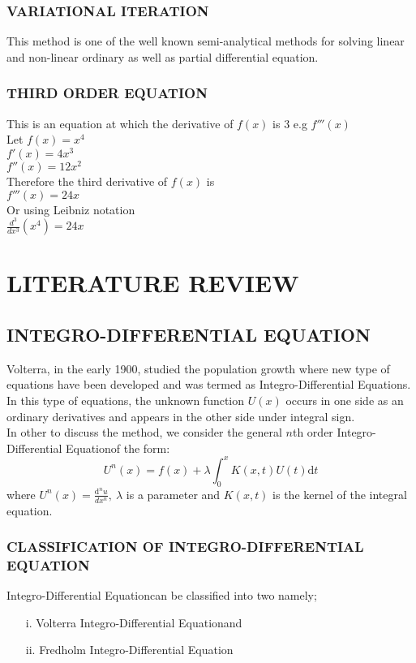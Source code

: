 \documentclass[12pt]{report}
\newcommand{\NI}{\noindent}
\newcommand{\dsp}{\displaystyle}
\newcommand{\IDE}{Integro-Differential Equation}
\newcommand{\IDEs}{Integro-Differential Equations}
\begin{document}
	\subsection{VARIATIONAL ITERATION}
	This method is one of the well known semi-analytical methods for solving linear and non-linear ordinary as well as partial differential equation.
	
	\subsection{THIRD ORDER EQUATION}
	This is an equation at which the derivative of $f(x)$ is 3 e.g $f'''(x)$\\
	Let
	$\dsp f(x) = x^4$\\
	$\dsp f'(x) = 4x^3$\\
	$\dsp f''(x) = 12x^2$\\
	Therefore the third derivative of $f(x)$ is\\
	$\dsp f'''(x) = 24x$\\
	Or using Leibniz notation\\
	$\dsp \frac{d^3}{dx^3}(x^4) = 24x$\\
	
	\chapter{LITERATURE REVIEW}
	\section{INTEGRO-DIFFERENTIAL EQUATION}
	Volterra, in the early 1900, studied the population growth where new type of equations have been developed and was termed as \IDEs. In this type of equations, the unknown function $U(x)$ occurs in one side as an ordinary derivatives and appears in the other side under integral sign.\\
	
	\NI In other to discuss the method, we consider the general $n$th order \IDE of the form:
	\begin{equation}
		U^n(x) = f(x) + \lambda \int_{0}^{x}K(x,t)U(t)\text{d}t
	\end{equation}
	where $\dsp U^n(x) = \frac{\text{d}^n u}{dx^n}, ~ \lambda$ is a parameter and $K(x,t)$ is the kernel of the integral equation.\\
	
	\subsection{CLASSIFICATION OF INTEGRO-DIFFERENTIAL EQUATION}
	\IDE can be classified into two namely;
	\begin{enumerate}
		\item [i.] Volterra \IDE and 
		
		\item[ii.] Fredholm \IDE
	\end{enumerate}
	
\end{document}
